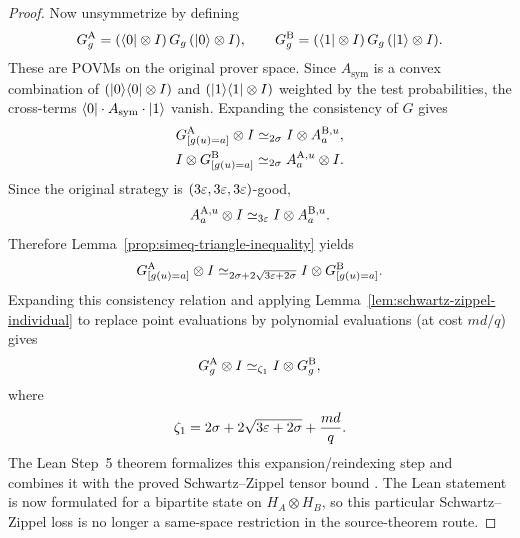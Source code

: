 \begin{proof}
	Now unsymmetrize by defining
	\[
		G_g^{\mathrm A} = (\langle 0 \rvert \otimes I)\, G_g\, (\lvert 0 \rangle \otimes I),
		\qquad
		G_g^{\mathrm B} = (\langle 1 \rvert \otimes I)\, G_g\, (\lvert 1 \rangle \otimes I).
	\]
	These are POVMs on the original prover space. Since $A_{\mathrm{sym}}$ is a convex combination of $(\lvert 0 \rangle\langle 0 \rvert \otimes I)$ and $(\lvert 1 \rangle\langle 1 \rvert \otimes I)$ weighted by the test probabilities, the cross-terms $\langle 0 \rvert \cdot A_{\mathrm{sym}} \cdot \lvert 1 \rangle$ vanish. Expanding the consistency of $G$ gives
	\begin{gather}
		G_{[g(u)=a]}^{\mathrm A} \otimes I \simeq_{2\sigma} I \otimes A_a^{\mathrm B,u}, \label{eq:cons-a}\\
		I \otimes G_{[g(u)=a]}^{\mathrm B} \simeq_{2\sigma} A_a^{\mathrm A,u} \otimes I. \label{eq:cons-b}
	\end{gather}
	Since the original strategy is $(3\varepsilon,3\varepsilon,3\varepsilon)$-good,
	\[
		A_a^{\mathrm A,u} \otimes I \simeq_{3\varepsilon} I \otimes A_a^{\mathrm B,u}.
	\]
	Therefore Lemma~\ref{prop:simeq-triangle-inequality} yields
	\[
		G_{[g(u)=a]}^{\mathrm A} \otimes I \simeq_{2\sigma + 2\sqrt{3\varepsilon+2\sigma}} I \otimes G_{[g(u)=a]}^{\mathrm B}.
	\]
	Expanding this consistency relation and applying Lemma~\ref{lem:schwartz-zippel-individual} to replace point evaluations by polynomial evaluations (at cost $md/q$) gives
	\begin{equation}\label{eq:G-self-consistency}
		G_g^{\mathrm A} \otimes I \simeq_{\zeta_1} I \otimes G_g^{\mathrm B},
	\end{equation}
	where
	\[
		\zeta_1 = 2\sigma + 2\sqrt{3\varepsilon+2\sigma} + \frac{md}{q}.
	\]
	The Lean Step~5 theorem
	formalizes this expansion/reindexing step and combines it with the proved
	Schwartz--Zippel tensor bound
	.  The
	Lean statement is now formulated for a bipartite state on
	\(H_A\otimes H_B\), so this particular Schwartz--Zippel loss is no longer a
	same-space restriction in the source-theorem route.


\end{proof}
